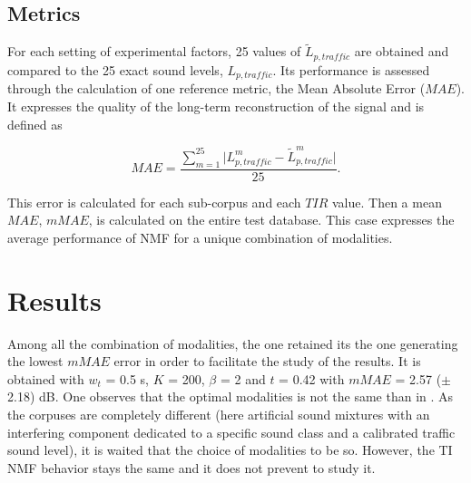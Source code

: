 \documentclass[12pt,english,twoside]{article}
\begin{document}
\subsection{Metrics}
For each setting of experimental factors, 25 values of $\tilde{L}_{p,traffic}$ are obtained and compared to the 25 exact sound levels, $L_{p,traffic}$. Its performance is assessed through the calculation of one reference metric, the Mean Absolute Error ($MAE$). It expresses the quality of the long-term reconstruction of the signal and is defined as

\begin{equation}
MAE = \frac{\sum_{m = 1}^{25}\vert L^m_{p,traffic}-\tilde{L}^m_{p,traffic} \vert}{25}.
\end{equation}

This error is calculated for each sub-corpus and each $TIR$ value. Then a mean $MAE$, $mMAE$, is calculated on the entire test database. This case expresses the average performance of NMF for a unique combination of modalities.

\section{Results}\label{part:results}

Among all the combination of modalities, the one retained its the one generating the lowest $mMAE$ error in order to facilitate the study of the results. 
It is obtained with $w_t$ = 0.5 s, $K$ = 200, $\beta$ = 2 and $t$ = 0.42 with $mMAE$ = 2.57 ($\pm$ 2.18) dB. 
One observes that the optimal modalities is not the same than in \cite{gloaguen2019road}. As the corpuses are completely different (here artificial sound mixtures with an interfering component dedicated to a specific sound class and a calibrated traffic sound level), it is waited that the choice of modalities to be so. However, the TI NMF behavior stays the same and it does not prevent to study it.
\end{document}
